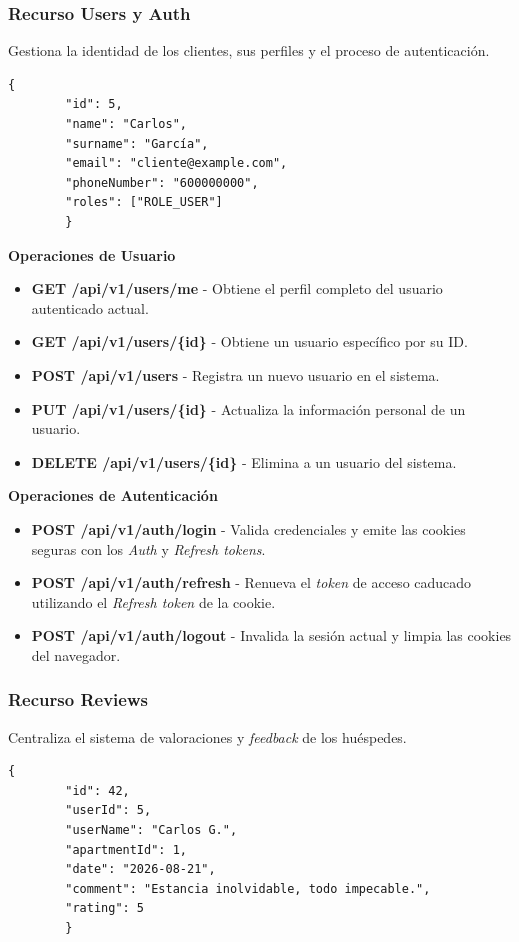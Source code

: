    \subsubsection{Recurso Users y Auth}
        Gestiona la identidad de los clientes, sus perfiles y el proceso de autenticación.
        \begin{lstlisting}[basicstyle=\jsonbasicfont,frame=single,backgroundcolor=\color{white},rulecolor=\color{black},framerule=0.5pt,numbers=none]
        {
        "id": 5,
        "name": "Carlos",
        "surname": "García",
        "email": "cliente@example.com",
        "phoneNumber": "600000000",
        "roles": ["ROLE_USER"]
        }
        \end{lstlisting}

        \textbf{Operaciones de Usuario}
        \begin{itemize}
            \item \textbf{GET /api/v1/users/me} - Obtiene el perfil completo del usuario autenticado actual.
            \item \textbf{GET /api/v1/users/\{id\}} - Obtiene un usuario específico por su ID.
            \item \textbf{POST /api/v1/users} - Registra un nuevo usuario en el sistema.
            \item \textbf{PUT /api/v1/users/\{id\}} - Actualiza la información personal de un usuario.
            \item \textbf{DELETE /api/v1/users/\{id\}} - Elimina a un usuario del sistema.
        \end{itemize}

        \textbf{Operaciones de Autenticación}
        \begin{itemize}
            \item \textbf{POST /api/v1/auth/login} - Valida credenciales y emite las cookies seguras con los \textit{Auth} y \textit{Refresh tokens}.
            \item \textbf{POST /api/v1/auth/refresh} - Renueva el \textit{token} de acceso caducado utilizando el \textit{Refresh token} de la cookie.
            \item \textbf{POST /api/v1/auth/logout} - Invalida la sesión actual y limpia las cookies del navegador.
        \end{itemize}

    \subsubsection{Recurso Reviews}
        Centraliza el sistema de valoraciones y \textit{feedback} de los huéspedes.
        \begin{lstlisting}[basicstyle=\jsonbasicfont,frame=single,backgroundcolor=\color{white},rulecolor=\color{black},framerule=0.5pt,numbers=none]
        {
        "id": 42,
        "userId": 5,
        "userName": "Carlos G.",
        "apartmentId": 1,
        "date": "2026-08-21",
        "comment": "Estancia inolvidable, todo impecable.",
        "rating": 5
        }
        \end{lstlisting}


